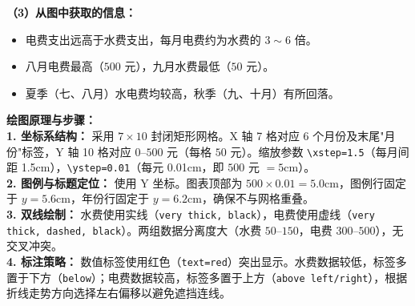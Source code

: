 \begin{center}
\end{center}

\vspace{0.3cm}
\textbf{（3）从图中获取的信息：}

\begin{itemize}
    \item 电费支出远高于水费支出，每月电费约为水费的 $3 \sim 6$ 倍。
    \item 八月电费最高（$500$ 元），九月水费最低（$50$ 元）。
    \item 夏季（七、八月）水电费均较高，秋季（九、十月）有所回落。
\end{itemize}

\vspace{0.4cm}
{\small\color{blue!70!black}
\textbf{绘图原理与步骤：}\\
\textbf{1. 坐标系结构：} 采用 $7 \times 10$ 封闭矩形网格。X 轴 7 格对应 6 个月份及末尾"月份"标签，Y 轴 10 格对应 $0$--$500$ 元（每格 $50$ 元）。缩放参数 \texttt{\textbackslash{}xstep=1.5}（每月间距 1.5cm），\texttt{\textbackslash{}ystep=0.01}（每元 0.01cm，即 $500$ 元 $= 5$cm）。\\
\textbf{2. 图例与标题定位：} 使用 Y 坐标。图表顶部为 $500 \times 0.01 = 5.0$cm，图例行固定于 $y=5.6$cm，年份行固定于 $y=6.2$cm，确保不与网格重叠。\\
\textbf{3. 双线绘制：} 水费使用实线（\texttt{very thick, black}），电费使用虚线（\texttt{very thick, dashed, black}）。两组数据分离度大（水费 $50$--$150$，电费 $300$--$500$），无交叉冲突。\\
\textbf{4. 标注策略：} 数值标签使用红色（\texttt{text=red}）突出显示。水费数据较低，标签多置于下方（\texttt{below}）；电费数据较高，标签多置于上方（\texttt{above left/right}），根据折线走势方向选择左右偏移以避免遮挡连线。
}

\newpage




